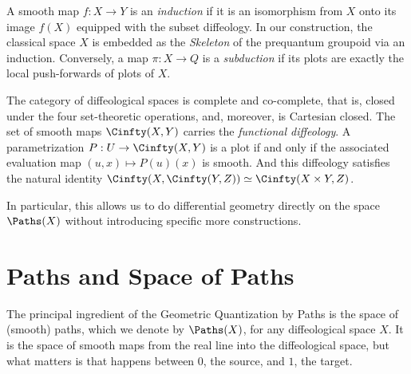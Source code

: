 \begin{article}
  A smooth map $f: X \to Y$ is an \emph{induction} if it is an isomorphism from $X$ onto its image $f(X)$ equipped with the subset diffeology.
  In our construction,
  the classical space $X$ is embedded as the \emph{Skeleton} of the prequantum groupoid via an induction.
  Conversely,
  a map $\pi: X \to Q$ is a \emph{subduction} if its plots are exactly the local push-forwards of plots of $X$.
\end{article}

\begin{article}
  \label{subsec:Functional Diffeology}
  The category of diffeological spaces is complete and co-complete,
  that is,
  closed under the four set-theoretic operations,
  and,
  moreover,
  is Cartesian closed.
  The set of smooth maps $\Cinfty(X, Y)$ carries the \emph{functional diffeology}.
  A parametrization $P: U \to \Cinfty(X, Y)$ is a plot if and only if the associated evaluation map $(u, x) \mapsto P(u)(x)$ is smooth.
  And this diffeology satisfies the natural identity $\Cinfty(X,\Cinfty(Y,Z)) \simeq \Cinfty(X \times Y,Z)$.
  
  In particular,
  this allows us to do differential geometry directly on the space $\Paths(X)$ without introducing specific more constructions.
\end{article}

\section{Paths and Space of Paths}
\label{sec:Paths and Space of Paths}

The principal ingredient of the Geometric Quantization by Paths is the space of (smooth) paths,
which we denote by $\Paths(X)$,
for any diffeological space $X$.
It is the space of smooth maps from the real line into the diffeological space,
but what matters is that happens between $0$,
the source,
and $1$,
the target.

